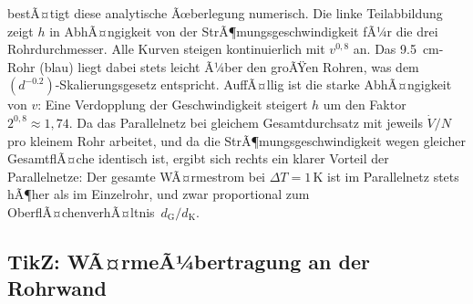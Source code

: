 ﻿\documentclass[12pt,a4paper,twoside]{article}
\theoremstyle{plain}
\theoremstyle{definition}
\theoremstyle{remark}
\newcommand{\dG}{d_{\mathrm{G}}}
\newcommand{\dK}{d_{\mathrm{K}}}
\begin{document}
\noindent
{} bestÃ¤tigt diese analytische Ãœberlegung numerisch.
Die linke Teilabbildung zeigt $h$ in AbhÃ¤ngigkeit von der StrÃ¶mungsgeschwindigkeit
fÃ¼r die drei Rohrdurchmesser.
Alle Kurven steigen kontinuierlich mit $v^{0{,}8}$ an.
Das \SI{9.5}{\centi\metre}-Rohr (blau) liegt dabei stets leicht Ã¼ber den groÃŸen
Rohren, was dem $(d^{-0.2})$-Skalierungsgesetz entspricht.
AuffÃ¤llig ist die starke AbhÃ¤ngigkeit von $v$: Eine Verdopplung der
Geschwindigkeit steigert $h$ um den Faktor~$2^{0{,}8} \approx 1{,}74$.
Da das Parallelnetz bei gleichem Gesamtdurchsatz mit jeweils $\dot{V}/N$ pro
kleinem Rohr arbeitet, und da die StrÃ¶mungsgeschwindigkeit wegen gleicher
GesamtflÃ¤che identisch ist, ergibt sich rechts ein klarer Vorteil der
Parallelnetze: Der gesamte WÃ¤rmestrom bei $\Delta T = 1\,\text{K}$ ist im
Parallelnetz stets hÃ¶her als im Einzelrohr, und zwar proportional zum
OberflÃ¤chenverhÃ¤ltnis~$\dG/\dK$.

\subsection{TikZ: WÃ¤rmeÃ¼bertragung an der Rohrwand}
\label{ssec:tikz_waerme}
\end{document}
